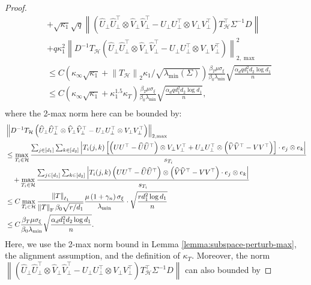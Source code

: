 \documentclass[12pt]{article}
\newcommand{\tF}{{\rm F}}
\newcommand{\abs}[1]{\left\lvert#1\right\rvert}
\newcommand{\norm}[1]{\left\lVert#1\right\rVert}
\newcommand{\cH}{\mathcal{H}}
\def\calH{{\mathcal H}}
\theoremstyle{plain}
\begin{document}
\begin{proof}
\begin{equation*}
\begin{aligned}
     & + \sqrt{\kappa_1}\sqrt{q}\norm{ \left(\widehat U_\perp \widehat U_\perp^\top \otimes \widehat V_\perp \widehat V_\perp^\top - U_\perp U_\perp^\top \otimes V_\perp V_\perp^\top \right) T_{\calH}^\top {\Sigma}^{-1}{D}
     }\\
     & + q \kappa_1^2 \norm{ D^{-1}T_{\calH}\left(\widehat U_\perp \widehat U_\perp^\top \otimes \widehat V_\perp \widehat V_\perp^\top - U_\perp U_\perp^\top \otimes V_\perp V_\perp^\top\right) }_{2,\max}^2 \\
     & \le C\left(\kappa_\infty\sqrt{\kappa_1} +\norm{T_{\calH}}_2\kappa_1/\sqrt{\lambda_{\min}(\Sigma)} \right)\frac{\beta_T \mu \sigma_\xi }{\beta_0 \lambda_{\min} }\sqrt{\frac{\alpha_d q d_1^2 d_2 \log d_1 }{n}} \\
     & \le C\left(\kappa_\infty\sqrt{\kappa_1} +\kappa_1^{1.5}\kappa_T \right)\frac{\beta_T \mu \sigma_\xi }{\beta_0 \lambda_{\min} }\sqrt{\frac{\alpha_d q d_1^2 d_2 \log d_1 }{n}}, \\
    \end{aligned} 
\end{equation*}
where the 2-max norm here can be bounded by:
\begin{equation}
    \begin{aligned}
      &\norm{ D^{-1}T_{\calH}\left(\widehat U_\perp \widehat U_\perp^\top \otimes \widehat V_\perp \widehat V_\perp^\top - U_\perp U_\perp^\top \otimes V_\perp V_\perp^\top\right) }_{2,\max} \\
      &\le \max_{T_i\in \cH }\frac{ \sum_{j\in[d_1] } \sum_{k\in [d_2] } \abs{T_i(j,k) \left[\left(U U^\top-\widehat U \widehat U^\top\right)\otimes V_{\perp}V_\perp^\top +  U_\perp U_\perp^\top \otimes \left(\widehat V \widehat V^\top -V V^\top \right) \right]\cdot e_j \otimes e_k} }{s_{T_i}  }\\
      & \quad + \max_{T_i\in \cH }\frac{ \sum_{j\in[d_1] } \sum_{k\in [d_2] } \abs{T_i(j,k) \left(U U^\top-\widehat U \widehat U^\top\right)\otimes \left(\widehat V \widehat V^\top -V V^\top \right) \cdot e_j \otimes e_k} }{s_{T_i}  }\\
      & \le C\max_{T_i\in \cH } \frac{\norm{T}_{\ell_1 } }{ \norm{T}_\tF \beta_0 \sqrt{r/d_1} } \frac{ \mu\left(1+\gamma_{n}\right) \sigma_{\xi}}{\lambda_{\min}} \cdot \sqrt{\frac{rd_1^2 \log d_1}{n}}   \\
      & \le C\frac{\beta_T \mu \sigma_\xi }{\beta_0 \lambda_{\min} }\sqrt{\frac{\alpha_d d_1^2 d_2 \log d_1 }{n}}.
    \end{aligned}
\end{equation}
Here, we use the 2-max norm bound in Lemma \ref{lemma:subspace-perturb-max}, the alignment assumption, and the definition of $\kappa_T$. Moreover, the norm $\norm{ \left(\widehat U_\perp \widehat U_\perp^\top \otimes \widehat V_\perp \widehat V_\perp^\top - U_\perp U_\perp^\top \otimes V_\perp V_\perp^\top \right) T_{\calH}^\top {\Sigma}^{-1}{D}
     }$ can also bounded by 


\end{proof}
\end{document}

